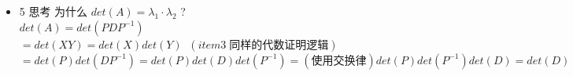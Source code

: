 \documentclass[12pt]{article}
\begin{document}
\begin{flushleft}
\begin{itemize}
              A 可以对角化
              $tr(A) = tr(PDP^{-1})$ \\
              $tr(A) = tr(XY) = tr(YX) = tr(P^{-1}PD) = tr(D) = \lambda_{1} + \lambda_{2}+ ...$ \\
              但我们也可以使用另一种视角 也就是 迹在不同基底的不变性 \\
              $tr(A) = tr(B) = tr(P^{-1}AP) =  tr(P^{-1}PDP^{-1}P) = tr(D) $
        \item 5 思考 为什么 $det(A) =  \lambda_{1} \cdot \lambda_{2}$ ? \\
              $det(A) = det(PDP^{-1})$\\
              $ = det(XY) = det(X)det(Y)\;\; (item3 \; 同样的代数证明逻辑)$ \\
              $ = det(P)det(DP^{-1}) = det(P)det(D)det(P^{-1}) = (使用交换律) det(P)det(P^{-1})det(D) = det(D)$

    \end{itemize}

\end{flushleft}
\end{document}
